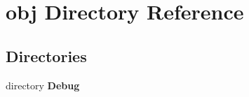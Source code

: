 \section{obj Directory Reference}
\label{dir_43724e81dd40e09f32417973865cdd64}
\subsection*{Directories}
\begin{DoxyCompactItemize}
\item 
directory \textbf{ Debug}
\end{DoxyCompactItemize}
